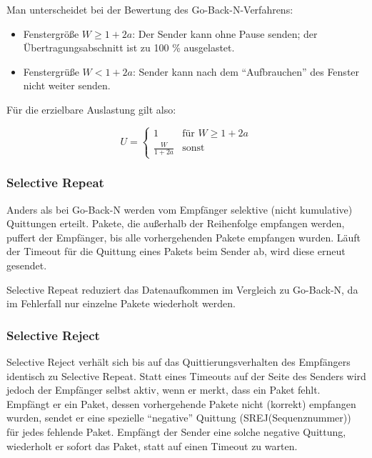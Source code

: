 \documentclass[a4paper, 14pt]{article}
\begin{document}
	Man unterscheidet bei der Bewertung des Go-Back-N-Verfahrens:

	\begin{itemize}
		\item Fenstergröße $W \geq 1 + 2a$: Der Sender kann ohne Pause senden; der Übertragungsabschnitt ist zu 100 \% ausgelastet.
		\item Fenstergrüße $W < 1 + 2a$: Sender kann nach dem \enquote{Aufbrauchen} des Fenster nicht weiter senden.
	\end{itemize}

	Für die erzielbare Auslastung gilt also:

	\begin{equation*}
		U = \begin{cases}
			1 & \text{für } W \geq 1 + 2a \\
			\frac{W}{1 + 2a} & \text{sonst}
		\end{cases}
	\end{equation*}

	\subsubsection{Selective Repeat}

	Anders als bei Go-Back-N werden vom Empfänger selektive (nicht kumulative) Quittungen erteilt.
	Pakete, die außerhalb der Reihenfolge empfangen werden, puffert der Empfänger, bis alle vorhergehenden Pakete empfangen wurden.
	Läuft der Timeout für die Quittung eines Pakets beim Sender ab, wird diese erneut gesendet.

	Selective Repeat reduziert das Datenaufkommen im Vergleich zu Go-Back-N, da im Fehlerfall nur einzelne Pakete wiederholt werden.

	\subsubsection{Selective Reject}

	Selective Reject verhält sich bis auf das Quittierungsverhalten des Empfängers identisch zu Selective Repeat.
	Statt eines Timeouts auf der Seite des Senders wird jedoch der Empfänger selbst aktiv, wenn er merkt, dass ein Paket fehlt.
	Empfängt er ein Paket, dessen vorhergehende Pakete nicht (korrekt) empfangen wurden, sendet er eine spezielle \enquote{negative} Quittung (SREJ(Sequenznummer)) für jedes fehlende Paket.
	Empfängt der Sender eine solche negative Quittung, wiederholt er sofort das Paket, statt auf einen Timeout zu warten.
\end{document}
